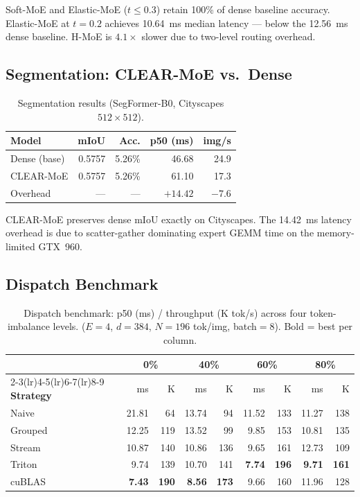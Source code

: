 \documentclass[conference]{IEEEtran}
\begin{document}
Soft-MoE and Elastic-MoE ($t{\leq}0.3$) retain 100\% of dense baseline
accuracy. Elastic-MoE at $t{=}0.2$ achieves 10.64~ms median latency ---
below the 12.56~ms dense baseline.
H-MoE is $4.1\times$ slower due to two-level routing overhead.

\subsection{Segmentation: CLEAR-MoE vs.\ Dense}

\begin{table}[htbp]
\caption{Segmentation results (SegFormer-B0, Cityscapes $512{\times}512$).}
\label{tab:seg}
\centering
\scriptsize
\begin{tabular}{lrrrr}
\toprule
\textbf{Model} & \textbf{mIoU} & \textbf{Acc.} & \textbf{p50 (ms)} & \textbf{img/s} \\
\midrule
Dense (base) & 0.5757 & 5.26\% & 46.68 & 24.9 \\
CLEAR-MoE    & 0.5757 & 5.26\% & 61.10 & 17.3 \\
Overhead     & ---    & ---    & $+14.42$ & $-7.6$ \\
\bottomrule
\end{tabular}
\end{table}

CLEAR-MoE preserves dense mIoU exactly on Cityscapes.
The 14.42~ms latency overhead is due to scatter-gather dominating expert
GEMM time on the memory-limited GTX~960.

\subsection{Dispatch Benchmark}

\begin{table}[htbp]
\caption{Dispatch benchmark: p50 (ms) / throughput (K tok/s) across
four token-imbalance levels. ($E{=}4$, $d{=}384$, $N{=}196$ tok/img,
batch${=}8$). Bold = best per column.}
\label{tab:dispatch}
\centering
\scriptsize
\setlength{\tabcolsep}{2.8pt}
\begin{tabular}{lrrrrrrrr}
\toprule
& \multicolumn{2}{c}{\textbf{0\%}} & \multicolumn{2}{c}{\textbf{40\%}} &
  \multicolumn{2}{c}{\textbf{60\%}} & \multicolumn{2}{c}{\textbf{80\%}} \\
\cmidrule(lr){2-3}\cmidrule(lr){4-5}\cmidrule(lr){6-7}\cmidrule(lr){8-9}
\textbf{Strategy} & ms & K & ms & K & ms & K & ms & K \\
\midrule
Naive   & 21.81 & 64  & 13.74 & 94  & 11.52 & 133 & 11.27 & 138 \\
Grouped & 12.25 & 119 & 13.52 & 99  & 9.85  & 153 & 10.81 & 135 \\
Stream  & 10.87 & 140 & 10.86 & 136 & 9.65  & 161 & 12.73 & 109 \\
Triton  & 9.74  & 139 & 10.70 & 141 & \textbf{7.74} & \textbf{196} & \textbf{9.71} & \textbf{161} \\
cuBLAS  & \textbf{7.43} & \textbf{190} & \textbf{8.56} & \textbf{173} & 9.66 & 160 & 11.96 & 128 \\
\bottomrule
\end{tabular}
\end{table}
\end{document}
